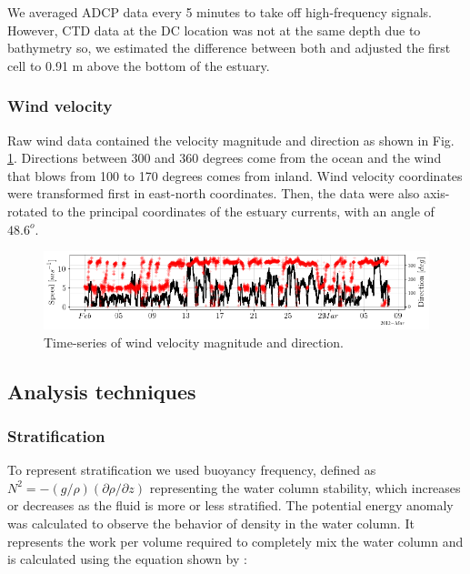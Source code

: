 \documentclass[tesis.tex]{subfiles}
\begin{document}
We averaged ADCP data every 5 minutes to take off high-frequency signals. However, CTD data at the DC location was not at the same depth due to bathymetry so, we estimated the difference between both and adjusted the first cell to 0.91 m above the bottom of the estuary. 

\subsubsection{Wind velocity}

Raw wind data contained the velocity magnitude and direction as shown in Fig. \ref{fig:wind_raw}. Directions between 300 and 360 degrees come from the ocean and the wind that blows from 100 to 170 degrees comes from inland. Wind velocity coordinates were transformed first in east-north coordinates. Then, the data were also axis-rotated to the principal coordinates of the estuary currents, with an angle of $48.6^o$.

\begin{figure}[h!]
    \centering
    \includegraphics[width=\textwidth]{Imagenes/wind_raw.png}
    \caption{Time-series of wind velocity magnitude and direction.}
    \label{fig:wind_raw}
\end{figure}

\subsection{Analysis techniques}

\subsubsection{Stratification}

To represent stratification we used buoyancy frequency, defined as $N^2 = -(g/\rho)(\partial \rho/\partial z)$ \citep{kundu2002fluid} representing the water column stability, which increases or decreases as the fluid is more or less stratified. The potential energy anomaly was calculated to observe the behavior of density in the water column. It represents the work per volume required to completely mix the water column and is calculated using the equation shown by \cite{simpson1990tidal}: 
\end{document}
